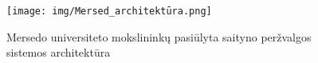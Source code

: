 \begin{figure}[ht]
\centering
\texttt{[image: img/Mersed\_architektūra.png]}
\caption{Mersedo universiteto mokslininkų pasiūlyta saityno peržvalgos sistemos architektūra \cite{MercedCloudBasedWebCrawler}}
\label{fig:mersed_architecture}
\end{figure}
